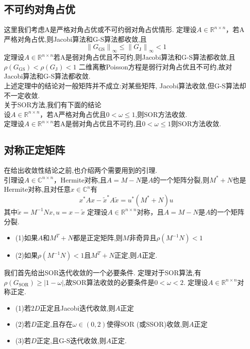 \documentclass[12pt,a4paper]{article}
\begin{document}
\subsection{\color{blue}不可约对角占优}
这里我们考虑A是严格对角占优或不可约弱对角占优情形.
{\color{blue}定理}\quad 设$A \in \mathbb{R}^{n \times n}$，若A严格对角占优,则Jacobi算法和G-S算法都收敛,且
$$
\left\|G_{\mathrm{GS}}\right\|_{\infty} \leq\left\|G_{\mathrm{J}}\right\|_{\infty}<1
$$
{\color{blue}定理}\quad 设$A \in \mathbb{R}^{n \times n}$若A是弱对角占优且不可约,则Jacobi算法和G-S算法都收敛,且$\rho\left(G_{\mathrm{GS}}\right)<\rho\left(G_{\mathrm{J}}\right)<1$
二维离散Poisson方程是弱行对角占优且不可约,故对Jacobi算法和G-S算法都收敛.\\
上述定理中的结论对一般矩阵并不成立:{\color{blue}对某些矩阵, Jacobi算法收敛,但G-S算法却不一定收敛}.\\
关于SOR方法,我们有下面的结论\\
设$A \in \mathbb{R}^{n \times n}$，若A严格对角占优且$0<\omega \leq 1$,则SOR方法收敛.\\
{\color{blue}定理}\quad 设$A \in \mathbb{R}^{n \times n}$若A是弱对角占优且不可约,且$0<\omega \leq 1$则SOR方法收敛.
\subsection{\color{blue}对称正定矩阵}
在给出收敛性结论之前,也介绍两个需要用到的引理.\\
{\color{blue}引理}\quad 设$A \in \mathbb{C}^{n \times n}$，Hermite对称,且$A=M-N$是$A$的一个矩阵分裂,则$M^{*}+N$也是Hermite对称,且对任意$x \in \mathbb{C}^{n}$有
$$
x^{*} A x-\tilde{x}^{*} A \tilde{x}=u^{*}\left(M^{*}+N\right) u
$$
其中$\tilde{x}=M^{-1} N x, u=x-\tilde{x}$
{\color{blue}定理}\quad 设$A \in \mathbb{R}^{n \times n}$对称，且$A=M-N$是$A$的一个矩阵分裂.
\begin{itemize}
\item (1)如果$A$和$M^{T}+N$都是正定矩阵,则$M$非奇异且$\rho\left(M^{-1} N\right)<1$
\item (2)如果$\rho\left(M^{-1} N\right)<1$且$M^{T}+N$正定,则$A$正定.
\end{itemize}
我们首先给出SOR迭代收敛的一个必要条件.
{\color{blue}定理}对于SOR算法,有$\rho\left(G_{\mathrm{SOR}}\right) \geq|1-\omega|$,故SOR算法收敛的必要条件是$0<\omega<2$.
{\color{blue}定理}\quad 设$A \in \mathbb{R}^{n \times n}$对称正定.
\begin{itemize}
\item (1)若$2D$正定且Jacobi迭代收敛,则$A$正定
\item (2)若$D$正定,且存在$\omega \in(0,2)$使得SOR (或SSOR)收敛,则$A$正定
\item (3)若$D$正定,且G-S迭代收敛,则$A$正定.
\end{itemize}
\end{document}
